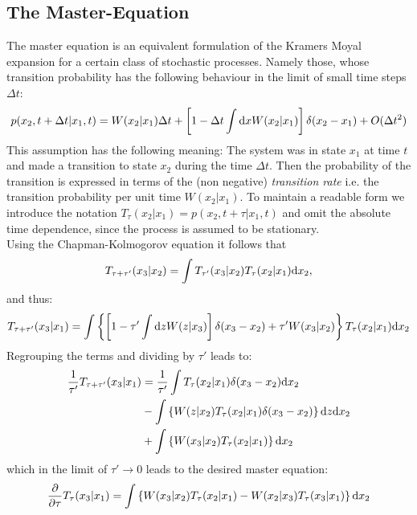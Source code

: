 \subsection{The Master-Equation}
\label{meq}
The master equation is an equivalent formulation of the Kramers Moyal expansion for a certain class of stochastic processes. Namely those, whose transition probability has the following behaviour in the limit of small time steps $\Delta t$:
\begin{equation}
    p(x_2,t+\Delta t|x_1,t) = W(x_2|x_1)\Delta t + \left[ 1 - \Delta t \int {\rm d} x W(x_2|x_1) \right] \delta(x_2-x_1) + O(\Delta t ^{2})
    \label{master assumption}
\end{equation}
This assumption has the following meaning: The system was in state $x_1$ at time $t$ and made a transition to state $x_2$ during the time $\Delta t$. Then the probability of the transition is expressed in terms of the (non negative) {\it transition rate} i.e. the transition probability per unit time $W(x_2|x_1)$. To maintain a readable form we introduce the notation $T_\tau (x_2|x_1) = p(x_2,t+\tau|x_1,t)$ and omit the absolute time dependence, since the process is assumed to be stationary. \\
Using the Chapman-Kolmogorov equation it follows that
\begin{equation}
    T_{\tau + \tau'}(x_3|x_2) = \int T_{\tau'}(x_3|x_2)T_{\tau}(x_2|x_1){\rm d} x_2,
    \label{K2}
\end{equation}
and thus:
\begin{equation*}
    T_{\tau+\tau'}(x_3|x_1) = \int \left\{ \left[1 - \tau' \int {\rm d} z W(z|x_3) \right] \delta(x_3 - x_2) + \tau' W(x_3|x_2) \right\} T_{\tau}(x_2|x_1){\rm d} x_2
\end{equation*}
Regrouping the terms and dividing by $\tau ' $ leads to:
\begin{align*}
    \frac{1}{\tau'} T_{\tau+\tau'}(x_3|x_1) &= \frac{1}{\tau'}  \int T_{\tau}(x_2|x_1) \delta(x_3 - x_2){\rm d} x_2\\
    &- \int \left\{ W(z|x_2)  T_{\tau}(x_2|x_1)\delta(x_3 - x_2) \right\}{\rm d} z {\rm d} x_2 \\
    &+ \int \left\{ W(x_3|x_2) T_{\tau}(x_2|x_1) \right\}{\rm d} x_2
\end{align*}
which in the limit of $\tau' \rightarrow 0$ leads to the desired master equation:
\begin{equation}
    \frac{\partial}{\partial \tau}T_{\tau}(x_3|x_1) = \int \left\{ W(x_3|x_2) T_{\tau}(x_2|x_1) - W(x_2|x_3) T_{\tau}(x_3|x_1) \right\}{\rm d} x_2
    \label{continuous_space_master_equation}
\end{equation}
